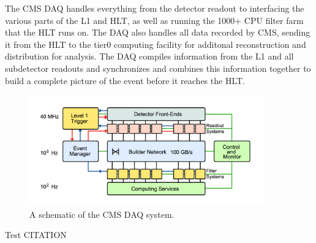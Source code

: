 The CMS DAQ handles everything from the detector readout to interfacing the various parts of the L1 and HLT, as well as running the 1000+ CPU filter farm that the HLT runs on. The DAQ also handles all data recorded by CMS, sending it from the HLT to the tier0 computing
facility for additonal reconstruction and distribution for analysis. The DAQ compiles information from the L1 and all subdetector readouts and synchronizes and combines this information together to build a complete picture of the event before it reaches the HLT.    

\begin{figure}[hbtp]
 \begin{center}
   \includegraphics[width=0.9\textwidth]{ch3_figs/cms_daq.pdf}
   \caption{A schematic of the CMS DAQ system.}
   \label{fig:cms_daq}
 \end{center}
\end{figure}

Test CITATION~\cite{CMS-AN-2013-130}

%
% 
% 
